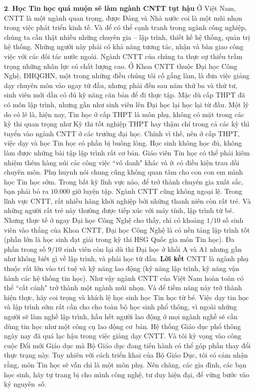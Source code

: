 \begin{multicols}{2}
	\vskip 0.05cm
	$\pmb{2.}$ \textbf{\color{diendantoanhoc}Học Tin học quá muộn sẽ làm ngành CNTT tụt hậu}
	\vskip 0.05cm
	Ở Việt Nam, CNTT là một ngành quan trọng, được Đảng và Nhà nước coi là một mũi nhọn trong việc phát triển kinh tế. Và để có thể cạnh tranh trong ngành công nghiệp, chúng ta cần thật nhiều những chuyên gia -- lập trình, thiết kế hệ thống, quản trị hệ thống. Những người này phải có khả năng tương tác, nhận và bàn giao công việc với các đối tác nước ngoài. Ngành CNTT của chúng ta thực sự thiếu trầm trọng những nhân lực có chất lượng cao.
	\vskip 0.05cm
	Ở Khoa CNTT thuộc Đại học Công Nghệ, ĐHQGHN, một trong những điều chúng tôi cố gắng làm, là đưa việc giảng dạy chuyên môn vào ngay từ đầu, nhưng phải đến sau năm thứ ba và thứ tư, sinh viên mới dần có đủ kỹ năng căn bản để đi thực tập. Mặc dù cấp THPT đã có môn lập trình, nhưng gần như sinh viên lên Đại học lại học lại từ đầu.
	\vskip 0.05cm
	Một lý do có lẽ là, hiện nay, Tin học ở cấp THPT là môn phụ, không có mặt trong các kỳ thi quan trọng như Kỳ thi tốt nghiệp THPT hay thậm chí trong cả các kỳ thì tuyển vào ngành CNTT ở các trường đại học. Chính vì thế, nên ở cấp THPT, việc dạy và học Tin học có phần bị buông lỏng. Học sinh không học đủ, không làm được những bài tập lập trình rất cơ bản. Giáo viên Tin học có thể phải kiêm nhiệm thêm hàng núi các công việc ``vô danh" khác và ít có điều kiện trau dồi chuyên môn. Phụ huynh nói chung cũng không quan tâm cho con con em mình học Tin học sớm.
	\vskip 0.05cm
	Trong bất kỳ lĩnh vực nào, để trở thành chuyên gia xuất sắc, bạn phải bỏ ra $10{.}000$ giờ luyện tập. Ngành CNTT cũng không ngoại lệ. Trong lĩnh vực CNTT, rất nhiều hãng khởi nghiệp bởi những thanh niên còn rất trẻ. Và những người rất trẻ này thường được tiếp xúc với máy tính, lập trình từ bé. Nhưng thực tế ở ngay Đại học Công Nghệ cho thấy, chỉ có khoảng $1/10$ số sinh viên vào thẳng của Khoa CNTT, Đại học Công Nghệ là có nền tảng lập trình tốt (phần lớn là học sinh đạt giải trong kỳ thi HSG Quốc gia môn Tin học). Đa phần trong số $9/10$ sinh viên còn lại dù thi Đại học ở khối A và A$1$ nhưng gần như không biết gì về lập trình, và phải học từ đầu. 
	\vskip 0.05cm
	\textbf{\color{diendantoanhoc}Lời kết}
	\vskip 0.05cm
	CNTT là ngành phụ thuộc rất lớn vào trí tuệ và kỹ năng lao động (kỹ năng lập trình, kỹ năng vận hành các hệ thống tin học). Như vậy ngành CNTT của Việt Nam hoàn toàn có thể ``cất cánh" trở thành một ngành mũi nhọn. Và để tiềm năng này trở thành hiện thực, hãy coi trọng và khích lệ học sinh học Tin học từ bé.
	\vskip 0.05cm
	Việc dạy tin học và lập trình sớm rất cần cho cho toàn bộ học sinh phổ thông, vì ngoài những người sẽ làm nghề lập trình, hầu hết người lao động ở mọi ngành nghề sẽ cần dùng tin học như một công cụ lao động cơ~bản. 
	\vskip 0.05cm
	Hệ thống Giáo dục phổ thông ngày nay đã quá lạc hậu trong việc giảng dạy CNTT. Và tôi kỳ vọng vào công cuộc Đổi mới Giáo dục mà Bộ Giáo dục đang tiến hành có thể góp phần thay đổi thực trạng này. Tuy nhiên với cách triển khai của Bộ Giáo Dục, tôi có cảm nhận rằng, môn Tin học sẽ vẫn chỉ là một môn phụ. Nên chăng, các gia đình, các bạn học sinh, hãy tự trang bị cho mình công nghệ, tư duy hiện đại, để vững bước vào kỷ nguyên~số.
\end{multicols}